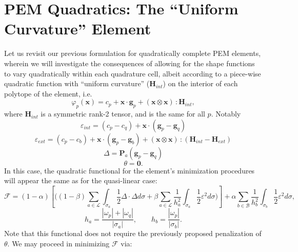 \documentclass[11pt]{article} %
\begin{document}
\newpage

\section{PEM Quadratics: The ``Uniform Curvature'' Element}

Let us revisit our previous formulation for quadratically complete PEM elements, wherein we will investigate the consequences of allowing for the shape functions to vary quadratically within each quadrature cell, albeit according to a piece-wise quadratic function with ``uniform curvature'' ($\mathbf{H}_{int}$) on the interior of each polytope of the element, i.e.
\begin{equation}
	\varphi_p (\mathbf{x}) = c_p + \mathbf{x} \cdot \mathbf{g}_p + (\mathbf{x} \otimes \mathbf{x}) \, \colon \mathbf{H}_{int},
\end{equation}
where $\mathbf{H}_{int}$ is a symmetric rank-2 tensor, and is the same for all $p$. Notably
\begin{equation}
	\varepsilon_{int} = (c_p - c_q) + \mathbf{x} \cdot (\mathbf{g}_p - \mathbf{g}_q)
\end{equation}
\begin{equation}
	\varepsilon_{ext} = (c_p - c_b) + \mathbf{x} \cdot (\mathbf{g}_p - \mathbf{g}_b) + (\mathbf{x} \otimes \mathbf{x}) \, \colon (\mathbf{H}_{int} - \mathbf{H}_{ext})
\end{equation}
\begin{equation}
	\Delta = \mathbf{P}_a ( \mathbf{g}_p - \mathbf{g}_q )
\end{equation}
\begin{equation}
	\theta = \mathbf{0}.
\end{equation}
In this case, the quadratic functional for the element's minimization procedures will appear the same as for the quasi-linear case:
\begin{equation}
	\mathcal{F} = (1-\alpha) \left[ \bigg( (1-\beta) \sum_{a \in \mathcal{L}} \int_{\sigma_a} \frac{1}{2} \Delta \cdot \Delta d \sigma + \beta \sum_{a \in \mathcal{L}} \frac{1}{h_a^2} \int_{\sigma_a} \frac{1}{2} \varepsilon^2 d \sigma \bigg) \right] + \alpha \sum_{b \in \mathcal{B}} \frac{1}{h_b^2} \int_{\sigma_b} \frac{1}{2} \varepsilon^2 d \sigma,
\end{equation}
\begin{equation}
	h_a = \frac{| \omega_p | + | \omega_q |}{| \sigma_a |}, \qquad h_b = \frac{| \omega_p |}{| \sigma_b |}.
\end{equation}
Note that this functional does not require the previously proposed penalization of $\theta$. We may proceed in minimizing $\mathcal{F}$ via:
\end{document}
